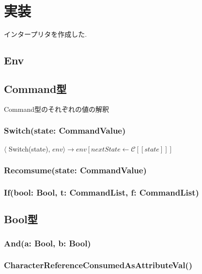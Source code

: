 \documentclass[uplatex,a4j]{jsreport}
\begin{document}
\chapter{実装}
\label{実装}
インタープリタを作成した.
\section{Env}

\section{Command型}
Command型のそれぞれの値の解釈
\subsection*{Switch(state: CommandValue)}
$\langle$ Switch(state), $env \rangle \rightarrow env[nextState \leftarrow \mathcal{C}[\![state]\!] ]$
\subsection*{Recomsume(state: CommandValue)}
\subsection*{If(bool: Bool, t: CommandList, f: CommandList)}
\begin{prooftree}
\end{prooftree}
\begin{prooftree}
\end{prooftree}

\section{Bool型}
\subsection*{And(a: Bool, b: Bool)}
\subsection*{CharacterReferenceConsumedAsAttributeVal()}
\end{document}

